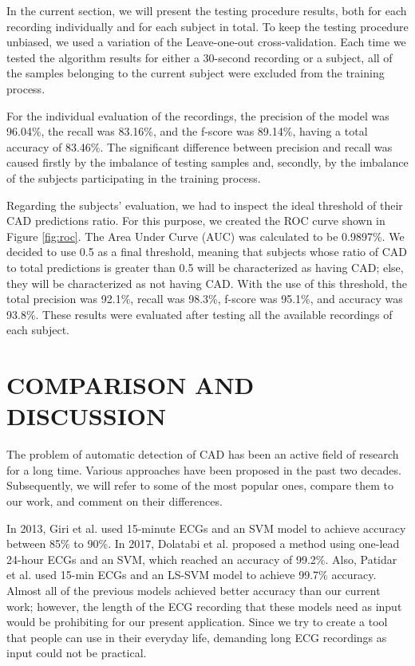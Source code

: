 In the current section, we will present the testing procedure results, both for each recording individually and for each subject in total. To keep the testing procedure unbiased, we used a variation of the Leave-one-out cross-validation. Each time we tested the algorithm results for either a 30-second recording or a subject, all of the samples belonging to the current subject were excluded from the training process.

For the individual evaluation of the recordings, the precision of the model was 96.04\%, the recall was 83.16\%, and the f-score was 89.14\%, having a total accuracy of 83.46\%. The significant difference between precision and recall was caused firstly by the imbalance of testing samples and, secondly, by the imbalance of the subjects participating in the training process.

Regarding the subjects' evaluation, we had to inspect the ideal threshold of their CAD predictions ratio. For this purpose, we created the ROC curve shown in Figure \ref{fig:roc}. The Area Under Curve (AUC) was calculated to be 0.9897\%. We decided to use 0.5 as a final threshold, meaning that subjects whose ratio of CAD to total predictions is greater than 0.5 will be characterized as having CAD; else, they will be characterized as not having CAD. With the use of this threshold, the total precision was 92.1\%, recall was 98.3\%, f-score was 95.1\%, and accuracy was 93.8\%. These results were evaluated after testing all the available recordings of each subject.

\section{COMPARISON AND DISCUSSION}
\label{sec:comparison}

The problem of automatic detection of CAD has been an active field of research for a long time. Various approaches have been proposed in the past two decades. Subsequently, we will refer to some of the most popular ones, compare them to our work, and comment on their differences.

In 2013, Giri et al. \cite{giri} used 15-minute ECGs and an SVM model to achieve accuracy between 85\% to 90\%. In 2017, Dolatabi et al. \cite{dolatabadi} proposed a method using one-lead 24-hour ECGs and an SVM, which reached an accuracy of 99.2\%. Also, Patidar et al. \cite{patidar} used 15-min ECGs and an LS-SVM model to achieve 99.7\% accuracy. Almost all of the previous models achieved better accuracy than our current work; however, the length of the ECG recording that these models need as input would be prohibiting for our present application. Since we try to create a tool that people can use in their everyday life, demanding long ECG recordings as input could not be practical.

